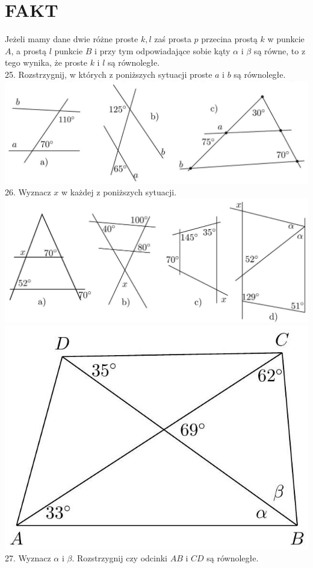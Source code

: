 \documentclass[10pt]{article}
\begin{document}
\section*{FAKT}
Jeżeli mamy dane dwie różne proste \(k, l\) zaś prosta \(p\) przecina prostą \(k\) w punkcie \(A\), a prostą \(l\) punkcie \(B\) i przy tym odpowiadające sobie kąty \(\alpha\) i \(\beta\) są równe, to z tego wynika, że proste \(k\) i \(l\) są równoległe.\\
25. Rozstrzygnij, w których z poniższych sytuacji proste \(a\) i \(b\) są równoległe.\\
\includegraphics[max width=\textwidth, center]{2024_11_21_8f01584889ff06348ae7g-193(2)}\\
26. Wyznacz \(x\) w każdej z poniższych sytuacji.\\
\includegraphics[max width=\textwidth, center]{2024_11_21_8f01584889ff06348ae7g-193(1)}\\
\includegraphics[max width=\textwidth, center]{2024_11_21_8f01584889ff06348ae7g-194(1)}\\
27. Wyznacz \(\alpha\) i \(\beta\). Rozstrzygnij czy odcinki \(A B\) i \(C D\) są równoległe.
\end{document}
